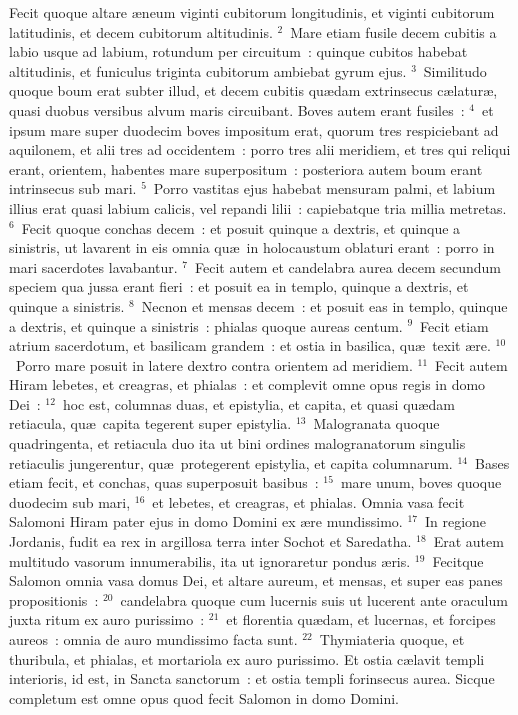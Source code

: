\bchapter
\lettrine[lines=3,image=true,loversize=0.05,lraise=-0.03]{F}{}ecit quoque altare \ae neum viginti cubitorum longitudinis, et viginti cubitorum latitudinis, et decem cubitorum altitudinis.
${}^{2}$~Mare etiam fusile decem cubitis a labio usque ad labium, rotundum per circuitum~: quinque cubitos habebat altitudinis, et funiculus triginta cubitorum ambiebat gyrum ejus.
${}^{3}$~Similitudo quoque boum erat subter illud, et decem cubitis qu\ae dam extrinsecus c\ae latur\ae , quasi duobus versibus alvum maris circuibant. Boves autem erant fusiles~:
${}^{4}$~et ipsum mare super duodecim boves impositum erat, quorum tres respiciebant ad aquilonem, et alii tres ad occidentem~: porro tres alii meridiem, et tres qui reliqui erant, orientem, habentes mare superpositum~: posteriora autem boum erant intrinsecus sub mari.
${}^{5}$~Porro vastitas ejus habebat mensuram palmi, et labium illius erat quasi labium calicis, vel repandi lilii~: capiebatque tria millia metretas.
${}^{6}$~Fecit quoque conchas decem~: et posuit quinque a dextris, et quinque a sinistris, ut lavarent in eis omnia qu\ae\ in holocaustum oblaturi erant~: porro in mari sacerdotes lavabantur.
${}^{7}$~Fecit autem et candelabra aurea decem secundum speciem qua jussa erant fieri~: et posuit ea in templo, quinque a dextris, et quinque a sinistris.
${}^{8}$~Necnon et mensas decem~: et posuit eas in templo, quinque a dextris, et quinque a sinistris~: phialas quoque aureas centum.
${}^{9}$~Fecit etiam atrium sacerdotum, et basilicam grandem~: et ostia in basilica, qu\ae\ texit \ae re.
${}^{10}$~Porro mare posuit in latere dextro contra orientem ad meridiem.
${}^{11}$~Fecit autem Hiram lebetes, et creagras, et phialas~: et complevit omne opus regis in domo Dei~:
${}^{12}$~hoc est, columnas duas, et epistylia, et capita, et quasi qu\ae dam retiacula, qu\ae\ capita tegerent super epistylia.
${}^{13}$~Malogranata quoque quadringenta, et retiacula duo ita ut bini ordines malogranatorum singulis retiaculis jungerentur, qu\ae\ protegerent epistylia, et capita columnarum.
${}^{14}$~Bases etiam fecit, et conchas, quas superposuit basibus~:
${}^{15}$~mare unum, boves quoque duodecim sub mari,
${}^{16}$~et lebetes, et creagras, et phialas. Omnia vasa fecit Salomoni Hiram pater ejus in domo Domini ex \ae re mundissimo.
${}^{17}$~In regione Jordanis, fudit ea rex in argillosa terra inter Sochot et Saredatha.
${}^{18}$~Erat autem multitudo vasorum innumerabilis, ita ut ignoraretur pondus \ae ris.
${}^{19}$~Fecitque Salomon omnia vasa domus Dei, et altare aureum, et mensas, et super eas panes propositionis~:
${}^{20}$~candelabra quoque cum lucernis suis ut lucerent ante oraculum juxta ritum ex auro purissimo~:
${}^{21}$~et florentia qu\ae dam, et lucernas, et forcipes aureos~: omnia de auro mundissimo facta sunt.
${}^{22}$~Thymiateria quoque, et thuribula, et phialas, et mortariola ex auro purissimo. Et ostia c\ae lavit templi interioris, id est, in Sancta sanctorum~: et ostia templi forinsecus aurea. Sicque completum est omne opus quod fecit Salomon in domo Domini.

